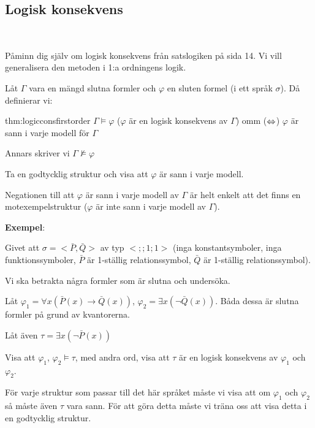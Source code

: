 \subsection{Logisk konsekvens}\hfill\\
\par\bigskip
\noindent Påminn dig själv om logisk konsekvens från satslogiken på sida 14. Vi vill generalisera den metoden i 1:a ordningens logik.
\par\bigskip
\noindent Låt $\Gamma$ vara en mängd slutna formler och $\varphi$ en sluten formel (i ett språk $\sigma$). Då definierar vi:
\par\bigskip
\begin{theo}{thm:logicconsfirstorder}
  $\Gamma\vDash\varphi$ ($\varphi$ är en logisk konsekvens av $\Gamma$) omm ($\Leftrightarrow$) $\varphi$ är sann i varje modell för $\Gamma$
  \par\bigskip
  \noindent Annars skriver vi $\Gamma\nvDash\varphi$
\end{theo}
\par\bigskip
\noindent Ta en godtycklig struktur och visa att $\varphi$ är sann i varje modell.\par
\noindent Negationen till att $\varphi$ är sann i varje modell av $\Gamma$ är helt enkelt att det finns en motexempelstruktur ($\varphi$ är inte sann i varje modell av $\Gamma$).
\par\bigskip
\noindent \textbf{Exempel}:\par
\noindent Givet att $\sigma = <\bar{P}, \bar{Q}>$ av typ $<;;1;1>$ (inga konstantsymboler, inga funktionssymboler, $\bar{P}$ är 1-ställig relationssymbol, $\bar{Q}$ är 1-ställig relationssymbol).\par
\noindent Vi ska betrakta några formler som är slutna och undersöka.\par
\noindent Låt $\varphi_1 = \forall x\left(\bar{P}(x)\rightarrow\bar{Q}(x)\right)$, $\varphi_2 = \exists x(\neg\bar{Q}(x))$. Båda dessa är slutna formler på grund av kvantorerna.\par
\noindent Låt även $\tau = \exists x(\neg\bar{P}(x))$\par
\noindent Visa att $\varphi_1$, $\varphi_2\vDash\tau$, med andra ord, visa att $\tau$ är en logisk konsekvens av $\varphi_1$ och $\varphi_2$.\par
\noindent För varje struktur som passar till det här språket måste vi visa att om $\varphi_1$ och $\varphi_2$ så måste även $\tau$ vara sann. För att göra detta måste vi träna oss att visa detta i en godtycklig struktur. 
